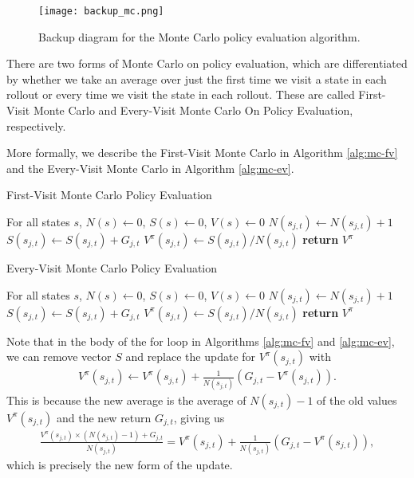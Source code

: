 \documentclass{article}
\begin{document}
\begin{figure}
    \centering
    \texttt{[image: backup\_mc.png]}
    \caption{Backup diagram for the Monte Carlo policy evaluation algorithm.}    \label{fig:backup-mc}
\end{figure}

There are two forms of Monte Carlo on policy evaluation, which are differentiated by whether we take an average over just the first time we visit a state in each rollout or every time we visit the state in each rollout.  These are called First-Visit Monte Carlo and Every-Visit Monte Carlo On Policy Evaluation, respectively.

More formally, we describe the First-Visit Monte Carlo in Algorithm \ref{alg:mc-fv} and the Every-Visit Monte Carlo in Algorithm \ref{alg:mc-ev}.

\begin{algorithm}
\caption{First-Visit Monte Carlo Policy Evaluation}\label{alg:mc-fv}
\begin{algorithmic}[1]
\State For all states $s$, $N(s)\gets 0$, $S(s)\gets 0$, $V(s)\gets 0$
\State $N(s_{j, t}) \gets N(s_{j, t}) + 1$
\State $S(s_{j, t}) \gets S(s_{j, t}) + G_{j, t}$
\State $V^\pi(s_{j, t}) \gets S(s_{j, t}) / N(s_{j, t})$
\EndIf
\EndFor
\EndFor
\State \textbf{return} $V^\pi$
\EndProcedure
\end{algorithmic}
\end{algorithm}

\begin{algorithm}
\caption{Every-Visit Monte Carlo Policy Evaluation}\label{alg:mc-ev}
\begin{algorithmic}[1]
\State For all states $s$, $N(s)\gets 0$, $S(s)\gets 0$, $V(s)\gets 0$
\State $N(s_{j, t}) \gets N(s_{j, t}) + 1$
\State $S(s_{j, t}) \gets S(s_{j, t}) + G_{j, t}$
\State $V^\pi(s_{j, t}) \gets S(s_{j, t}) / N(s_{j, t})$
\EndFor
\EndFor
\State \textbf{return} $V^\pi$
\EndProcedure
\end{algorithmic}
\end{algorithm}

Note that in the body of the for loop in Algorithms \ref{alg:mc-fv} and \ref{alg:mc-ev}, we can remove vector $S$ and replace the update for $V^\pi(s_{j, t})$ with
\begin{align}
V^\pi(s_{j, t}) \gets V^\pi(s_{j, t}) + \frac{1}{N(s_{j, t})}(G_{j, t} - V^\pi(s_{j, t})).
\end{align}
This is because the new average is the average of $N(s_{j, t}) - 1$ of the old values $V^\pi(s_{j, t})$ and the new return $G_{j, t}$, giving us
\begin{align}
\frac{V^\pi(s_{j, t}) \times (N(s_{j, t}) - 1) + G_{j, t}}{N(s_{j, t})} = V^\pi(s_{j, t}) + \frac{1}{N(s_{j, t})}(G_{j, t} - V^\pi(s_{j, t})),
\end{align}
which is precisely the new form of the update.
\end{document}
